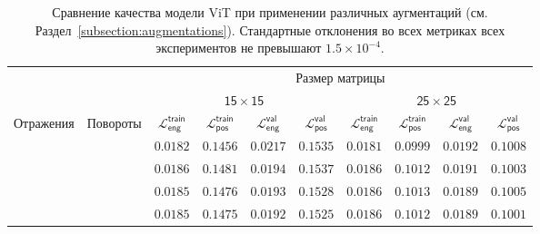 \documentclass[a4paper,12pt]{extarticle}
\newcommand{\cmark}{\ding{51}}
\newcommand{\xmark}{\ding{55}}
\begin{document}
\begin{table}[t]
	\footnotesize
	\centering
	\begin{tabular}{cc|cccc|cccc}
		\toprule
		{} & {} & \multicolumn{8}{c}{\textsf{Размер матрицы}} \\
		\cmidrule(lr){3-10}
        {} & {} & \multicolumn{4}{c}{$\mathsf{15 \times 15}$} \vline & \multicolumn{4}{c}{$\mathsf{25 \times 25}$} \\
		\midrule
        \textsf{Отражения} & \textsf{Повороты} & $\mathcal{L}_{\mathsf{eng}}^{\mathsf{train}}$ & $\mathcal{L}_{\mathsf{pos}}^{\mathsf{train}}$ & $\mathcal{L}_{\mathsf{eng}}^{\mathsf{val}}$ & $\mathcal{L}_{\mathsf{pos}}^{\mathsf{val}}$ & $\mathcal{L}_{\mathsf{eng}}^{\mathsf{train}}$ & $\mathcal{L}_{\mathsf{pos}}^{\mathsf{train}}$ & $\mathcal{L}_{\mathsf{eng}}^{\mathsf{val}}$ & $\mathcal{L}_{\mathsf{pos}}^{\mathsf{val}}$ \\
        \midrule
        \xmark & \xmark & $\mathsf{0.0182}$ & $\mathsf{0.1456}$ & $\mathsf{0.0217}$ & $\mathsf{0.1535}$ & $\mathsf{0.0181}$ & $\mathsf{0.0999}$ & $\mathsf{0.0192}$ & $\mathsf{0.1008}$ \\
        \cmark & \xmark & $\mathsf{0.0186}$ & $\mathsf{0.1481}$ & $\mathsf{0.0194}$ & $\mathsf{0.1537}$ & $\mathsf{0.0186}$ & $\mathsf{0.1012}$ & $\mathsf{0.0191}$ & $\mathsf{0.1003}$ \\
        \xmark & \cmark & $\mathsf{0.0185}$ & $\mathsf{0.1476}$ & $\mathsf{0.0193}$ & $\mathsf{0.1528}$ & $\mathsf{0.0186}$ & $\mathsf{0.1013}$ & $\mathsf{0.0189}$ & $\mathsf{0.1005}$ \\
        \cmark & \cmark & $\mathsf{0.0185}$ & $\mathsf{0.1475}$ & $\mathsf{0.0192}$ & $\mathsf{0.1525}$ & $\mathsf{0.0186}$ & $\mathsf{0.1012}$ & $\mathsf{0.0189}$ & $\mathsf{0.1001}$ \\        
        
		\bottomrule
	\end{tabular}
    \caption{Сравнение качества модели \textsf{ViT} при применении различных аугментаций (см. Раздел~\ref{subsection:augmentations}). Стандартные отклонения во всех метриках всех экспериментов не превышают $1.5 \times 10^{-4}$.}
	\label{table:augmentations}
\end{table}
\end{document}
